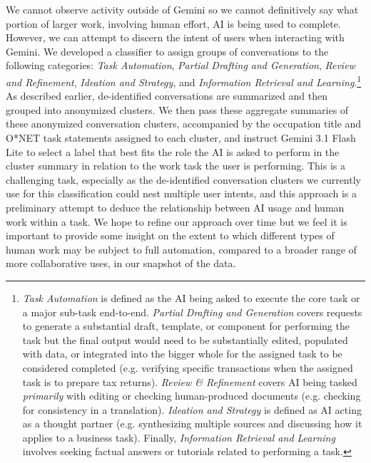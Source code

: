 \documentclass[11pt,a4paper]{article}
\begin{document}
We cannot observe activity outside of Gemini so we cannot definitively say what portion of larger work, involving human effort, AI is being used to complete. However, we can attempt to discern the intent of users when interacting with Gemini. We developed a classifier to assign groups of conversations to the following categories: \textit{Task Automation}, \textit{Partial Drafting and Generation}, \textit{Review and Refinement}, \textit{Ideation and Strategy}, and \textit{Information Retrieval and Learning}.\footnote{\textit{Task Automation} is defined as the AI being asked to execute the core task or a major sub-task end-to-end. \textit{Partial Drafting and Generation} covers requests to generate a substantial draft, template, or component for performing the task but the final output would need to be substantially edited, populated with data, or integrated into the bigger whole for the assigned task to be considered completed (e.g. verifying specific transactions when the assigned task is to prepare tax returns). \textit{Review \& Refinement} covers AI being tasked \textit{primarily} with editing or checking human-produced documents (e.g. checking for consistency in a translation). \textit{Ideation and Strategy} is defined as AI acting as a thought partner (e.g. synthesizing multiple sources and discussing how it applies to a business task). Finally, \textit{Information Retrieval and Learning} involves seeking factual answers or tutorials related to performing a task.} As described earlier, de-identified conversations are summarized and then grouped into anonymized clusters. We then pass these aggregate summaries of these anonymized conversation clusters, accompanied by the occupation title and O*NET task statements assigned to each cluster, and instruct Gemini 3.1 Flash Lite to select a label that best fits the role the AI is asked to perform in the cluster summary in relation to the work task the user is performing. This is a challenging task, especially as the de-identified conversation clusters we currently use for this classification could nest multiple user intents, and this approach is a preliminary attempt to deduce the relationship between AI usage and human work within a task. We hope to refine our approach over time but we feel it is important to provide some insight on the extent to which different types of human work may be subject to full automation, compared to a broader range of more collaborative uses, in our snapshot of the data.
\end{document}
